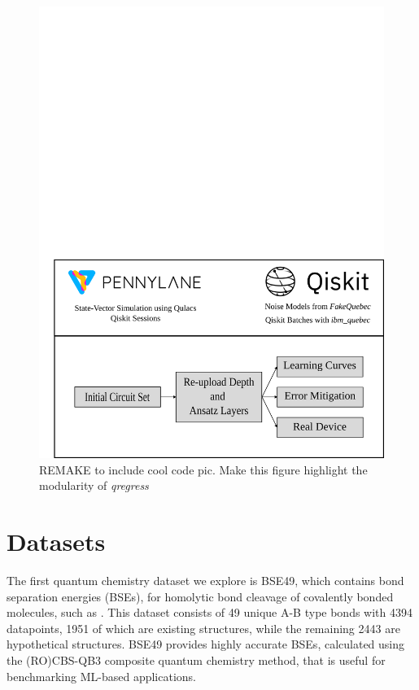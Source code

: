 \documentclass[journal=jacsat,manuscript=article]{achemso}
\begin{document}
\begin{figure}[H]
	\centering
	\includegraphics[width=\linewidth]{../images/manuscript_figures/overview.png}
	\caption{REMAKE to include cool code pic. Make this figure highlight the modularity of \textit{qregress}}
	\label{fig:overview_project}
\end{figure}







\section{Datasets}\label{subsection:datasets}

The first quantum chemistry dataset we explore is BSE49, which contains bond separation energies (BSEs), for homolytic bond cleavage of covalently bonded molecules, such as .\cite{prasad_bse49_2021}
This dataset consists of 49 unique A-B type bonds with 4394 datapoints, 1951 of which are existing structures, while the remaining 2443 are hypothetical structures. 
BSE49 provides highly accurate BSEs, calculated using the  (RO)CBS-QB3\cite{wood_restricted-open-shell_2006,montgomery_complete_1999,montgomery_complete_2000} composite quantum chemistry method, that is useful for benchmarking ML-based applications.
\end{document}
